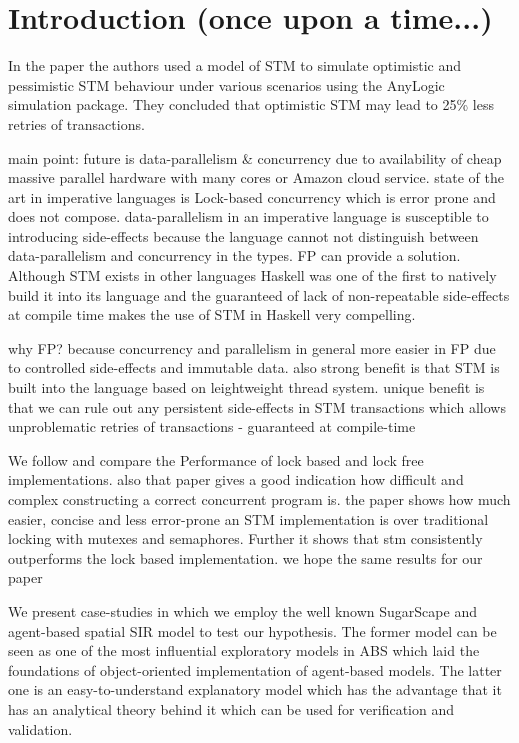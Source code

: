 \section{Introduction (once upon a time...)}
In the paper \cite{heindl_modeling_2009} the authors used a model of STM to simulate optimistic and pessimistic STM behaviour under various scenarios using the AnyLogic simulation package. They concluded that optimistic STM may lead to 25\% less retries of transactions.

main point: future is data-parallelism \& concurrency due to availability of cheap massive parallel hardware with many cores or Amazon cloud service. state of the art in imperative languages is Lock-based concurrency which is error prone and does not compose. data-parallelism in an imperative language is susceptible to introducing side-effects because the language cannot not distinguish between data-parallelism and concurrency in the types. FP can provide a solution. Although STM exists in other languages Haskell was one of the first to natively build it into its language and the guaranteed of lack of non-repeatable side-effects at compile time makes the use of STM in Haskell very compelling.

why FP? because concurrency and parallelism in general more easier in FP due to controlled side-effects and immutable data. also strong benefit is that STM is built into the language based on leightweight thread system. unique benefit is that we can rule out any persistent side-effects in STM transactions which allows unproblematic retries of transactions - guaranteed at compile-time

We follow \cite{discolo_lock_2006} and compare the Performance of lock based and lock free implementations. also that paper gives a good indication how difficult and complex constructing a correct concurrent program is. the paper shows how much easier, concise and less error-prone an STM implementation is over traditional locking with mutexes and semaphores. Further it shows that stm consistently outperforms the lock based implementation. we hope the same results for our paper

We present case-studies in which we employ the well known SugarScape \citep{epstein_growing_1996} and agent-based spatial SIR \citep{macal_agent-based_2010} model to test our hypothesis. The former model can be seen as one of the most influential exploratory models in ABS which laid the foundations of object-oriented implementation of agent-based models. The latter one is an easy-to-understand explanatory model which has the advantage that it has an analytical theory behind it which can be used for verification and validation. 

